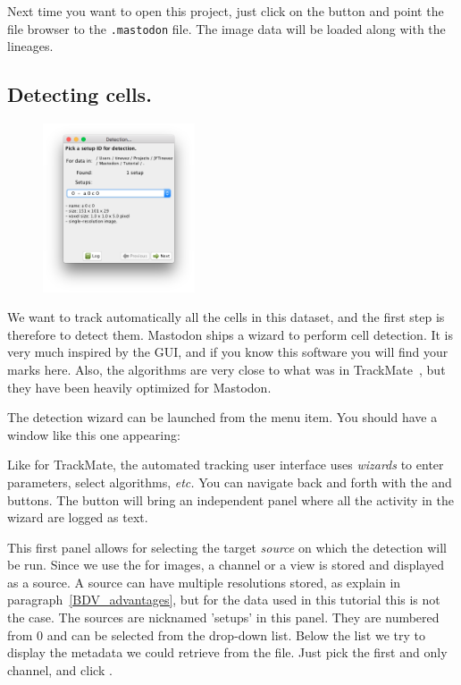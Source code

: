 Next time you want to open this project, just click on the  button and point the file browser to the \texttt{.mastodon} file.
The image data will be loaded along with the lineages.



\subsection{Detecting cells.}

\begin{figure}
    \centering
         \includegraphics[width=0.4\textwidth]{figures/Mastodon_DetectionWizard_01.png}
\end{figure}

We want to track automatically all the cells in this dataset, and the first step is therefore to detect them.
Mastodon ships a wizard to perform cell detection. 
It is very much inspired by the  GUI, and if you know this software you will find your marks here.
Also, the algorithms are very close to what was in TrackMate~\cite{TrackMate}, but they have been heavily optimized for Mastodon.

The detection wizard can be launched from the  menu item. 
You should have a window like this one appearing:

Like for TrackMate, the automated tracking user interface uses \textit{wizards} to enter parameters, select algorithms, \textit{etc.}
You can navigate back and forth with the  and   buttons. 
The  button will bring an independent panel where all the activity in the wizard are logged as text. 

This first panel allows for selecting the target \textit{source} on which the detection will be run. 
Since we use the \bdv for images, a channel or a view is stored and displayed as a source. 
A source can have multiple resolutions stored, as explain in paragraph~\ref{BDV_advantages}, but for the data used in this tutorial this is not the case. The sources are nicknamed 'setups' in this panel.
They are numbered from 0 and can be selected from the drop-down list. 
Below the list we try to display the metadata we could retrieve from the \bdv file.
Just pick the first and only channel, and click .

